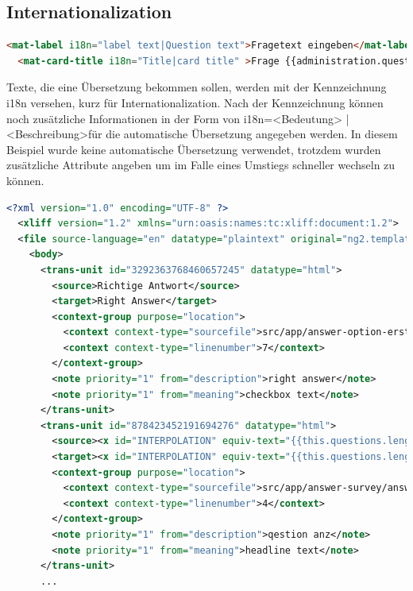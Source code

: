 \subsection{Internationalization}
\begin{lstlisting}[language=HTML, caption=Internationalization-Makierung im HTML, label=lst:Internationalization_HTML]
  <mat-label i18n="label text|Question text">Fragetext eingeben</mat-label>
  <mat-card-title i18n="Title|card title" >Frage {{administration.question.sequenceNumber}}</mat-card-title>
\end{lstlisting}

Texte, die eine Übersetzung bekommen sollen, werden mit der Kennzeichnung i18n versehen, kurz für Internationalization.
Nach der Kennzeichnung können noch zusätzliche Informationen in der Form von i18n=\dq <Bedeutung> | <Beschreibung>\dq  für die automatische Übersetzung angegeben werden. 
In diesem Beispiel wurde keine automatische Übersetzung verwendet, trotzdem wurden zusätzliche Attribute angeben um im Falle eines Umstiegs schneller wechseln zu können.
\newline
\newline
\begin{lstlisting}[language=XML, caption=xliff-Datei, label=lst:xliffDatei]
  <?xml version="1.0" encoding="UTF-8" ?>
  <xliff version="1.2" xmlns="urn:oasis:names:tc:xliff:document:1.2">
  <file source-language="en" datatype="plaintext" original="ng2.template">
    <body>
      <trans-unit id="3292363768460657245" datatype="html">
        <source>Richtige Antwort</source>
        <target>Right Answer</target>
        <context-group purpose="location">
          <context context-type="sourcefile">src/app/answer-option-erstellen/answer-option-erstellen.component.html</context>
          <context context-type="linenumber">7</context>
        </context-group>
        <note priority="1" from="description">right answer</note>
        <note priority="1" from="meaning">checkbox text</note>
      </trans-unit>
      <trans-unit id="878423452191694276" datatype="html">
        <source><x id="INTERPOLATION" equiv-text="{{this.questions.length}}"/> Fragen</source>
        <target><x id="INTERPOLATION" equiv-text="{{this.questions.length}}"/> Question</target>
        <context-group purpose="location">
          <context context-type="sourcefile">src/app/answer-survey/answer-survey.component.html</context>
          <context context-type="linenumber">4</context>
        </context-group>
        <note priority="1" from="description">qestion anz</note>
        <note priority="1" from="meaning">headline text</note>
      </trans-unit>
      ...
\end{lstlisting}

